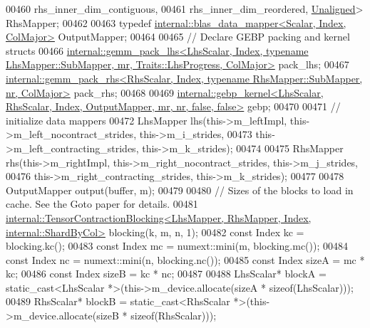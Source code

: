 \begin{DoxyCode}
00460                                                    rhs\_inner\_dim\_contiguous,
00461                                                    rhs\_inner\_dim\_reordered, 
      \hyperlink{group__enums_gga45fe06e29902b7a2773de05ba27b47a1ac935220b4c844108e183ebe30a4d5204}{Unaligned}> RhsMapper;
00462 
00463     \textcolor{keyword}{typedef} \hyperlink{class_eigen_1_1internal_1_1blas__data__mapper}{internal::blas\_data\_mapper<Scalar, Index, ColMajor>}
       OutputMapper;
00464 
00465     \textcolor{comment}{// Declare GEBP packing and kernel structs}
00466     
      \hyperlink{struct_eigen_1_1internal_1_1gemm__pack__lhs}{internal::gemm\_pack\_lhs<LhsScalar, Index, typename LhsMapper::SubMapper, mr, Traits::LhsProgress, ColMajor>}
       pack\_lhs;
00467     
      \hyperlink{struct_eigen_1_1internal_1_1gemm__pack__rhs}{internal::gemm\_pack\_rhs<RhsScalar, Index, typename RhsMapper::SubMapper, nr, ColMajor>}
       pack\_rhs;
00468 
00469     
      \hyperlink{struct_eigen_1_1internal_1_1gebp__kernel}{internal::gebp\_kernel<LhsScalar, RhsScalar, Index, OutputMapper, mr, nr, false, false>}
       gebp;
00470 
00471     \textcolor{comment}{// initialize data mappers}
00472     LhsMapper lhs(this->m\_leftImpl, this->m\_left\_nocontract\_strides, this->m\_i\_strides,
00473                   this->m\_left\_contracting\_strides, this->m\_k\_strides);
00474 
00475     RhsMapper rhs(this->m\_rightImpl, this->m\_right\_nocontract\_strides, this->m\_j\_strides,
00476                   this->m\_right\_contracting\_strides, this->m\_k\_strides);
00477 
00478     OutputMapper output(buffer, m);
00479 
00480     \textcolor{comment}{// Sizes of the blocks to load in cache. See the Goto paper for details.}
00481     
      \hyperlink{class_eigen_1_1internal_1_1_tensor_contraction_blocking}{internal::TensorContractionBlocking<LhsMapper, RhsMapper, Index, internal::ShardByCol>}
       blocking(k, m, n, 1);
00482     \textcolor{keyword}{const} Index kc = blocking.kc();
00483     \textcolor{keyword}{const} Index mc = numext::mini(m, blocking.mc());
00484     \textcolor{keyword}{const} Index nc = numext::mini(n, blocking.nc());
00485     \textcolor{keyword}{const} Index sizeA = mc * kc;
00486     \textcolor{keyword}{const} Index sizeB = kc * nc;
00487 
00488     LhsScalar* blockA = \textcolor{keyword}{static\_cast<}LhsScalar *\textcolor{keyword}{>}(this->m\_device.allocate(sizeA * \textcolor{keyword}{sizeof}(LhsScalar)));
00489     RhsScalar* blockB = \textcolor{keyword}{static\_cast<}RhsScalar *\textcolor{keyword}{>}(this->m\_device.allocate(sizeB * \textcolor{keyword}{sizeof}(RhsScalar)));

\end{DoxyCode}
